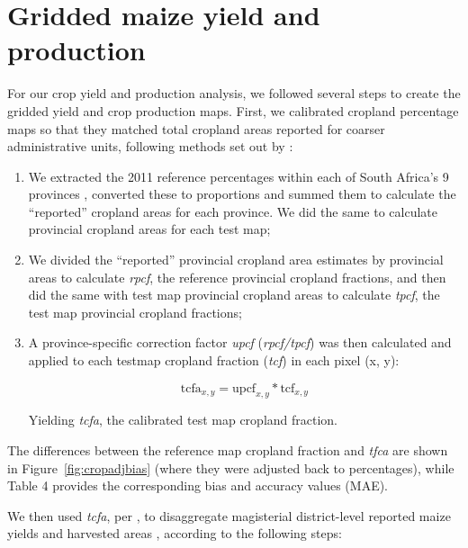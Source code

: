 \documentclass[12pt, titlepage]{article}
\begin{document}
%

\FloatBarrier


\clearpage
\section{\large Gridded maize yield and production}

For our crop yield and production analysis, we followed several steps to create the gridded yield and crop production maps. First, we calibrated cropland percentage maps so that they matched total cropland areas reported for coarser administrative units, following methods set out by \citet{ramankutty_farming_2008}: 

\begin{enumerate}
 \item We extracted the 2011 reference percentages within each of South Africa's 9 provinces \citep[the same units used by][]{ramankutty_farming_2008}, converted these to proportions and summed them to calculate the ``reported'' cropland areas for each province. We did the same to calculate provincial cropland areas for each test map;  
  \item We divided the ``reported'' provincial cropland area estimates by provincial areas to calculate \emph{rpcf}, the reference provincial cropland fractions, and then did the same with test map provincial cropland areas to calculate \emph{tpcf}, the test map provincial cropland fractions; 
  \item A province-specific correction factor \emph{upcf} (\emph{rpcf/tpcf}) was then calculated and applied to each testmap cropland fraction (\emph{tcf}) in each pixel (x, y):

  \begin{equation}  
    \textrm{tcfa}_{x,y} = \textrm{upcf}_{x,y} * \textrm{tcf}_{x,y}
  \end{equation}

Yielding \emph{tcfa}, the calibrated test map cropland fraction.  
\end{enumerate}

The differences between the reference map cropland fraction and \emph{tfca} are shown in Figure~\ref{fig:cropadjbias} (where they were adjusted back to percentages), while Table 4 provides the corresponding bias and accuracy values (MAE).

We then used \emph{tcfa}, per \citet{monfreda_farming_2008}, to disaggregate magisterial district-level reported maize yields and harvested areas \citep{statistics_south_africa_commercial_2007}, according to the following steps: 
\end{document}
